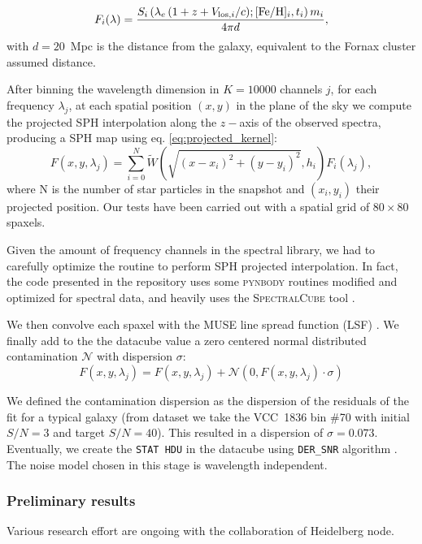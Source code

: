 \begin{equation}
  F_i(\lambda) = \frac{S_i\left(\lambda_e\,(1 + z + V_{\mathrm{los},i}/c);[\text{Fe}/\text{H}]_i, t_i \right) m_i }{4\pi d},
  \label{eq:shifted_flux}
\end{equation}
with $d = 20$~Mpc is the distance from the galaxy, equivalent to the Fornax cluster assumed distance.

After binning the wavelength dimension in $K=10000$ channels $j$, for each frequency $\lambda_j$, at each spatial position $(x,y)$ in the plane of the sky we compute the projected SPH interpolation along the $z-$axis of the observed spectra, producing a SPH map using eq. \eqref{eq:projected_kernel}:
\begin{equation}
  F(x,y, \lambda_j) = \sum_{i=0}^{N} \tilde{W} \left(\sqrt{(x-x_i)^2+(y-y_i)^2}, h_i \right) F_i(\lambda_j),
\end{equation}
where N is the number of star particles in the snapshot and $(x_i, y_i)$ their projected position.
Our tests have been carried out with a spatial grid of $80\times 80$ spaxels.

Given the amount of frequency channels in the spectral library, we had to carefully optimize the routine to perform SPH projected interpolation.
In fact, the code presented in the repository \citet{simifucube} uses some \textsc{pynbody} \citep{Pontzen2013} routines modified and optimized for spectral data, and heavily uses the \textsc{SpectralCube} tool \citep{SpectralCube}.

We then convolve each spaxel with the MUSE line spread function (LSF) \citep[$F_{\mathrm{udf}10}$, eq. (8) in][]{Bacon2017}.
We finally add to the the datacube value a zero centered normal distributed contamination $\mathcal{N}$ with dispersion $\sigma$:
\begin{equation}
  F(x,y, \lambda_j) = F(x,y, \lambda_j) + \mathcal{N}(0, F(x,y, \lambda_j)\cdot \sigma )
\end{equation}

We defined the contamination dispersion as the dispersion of the residuals of the fit for a typical galaxy (from \citet{Bidaran2020} dataset we take the VCC~1836 bin \#70 with initial $S/N=3$ and target $S/N=40$).
This resulted in a dispersion of $\sigma = 0.073$.
Eventually, we create the \verb|STAT HDU| in the datacube using \verb|DER_SNR| algorithm \citep{Stoehr2008}. The noise model chosen in this stage is wavelength independent.

\subsubsection{Preliminary results}
Various research effort are ongoing with the collaboration of Heidelberg node.


